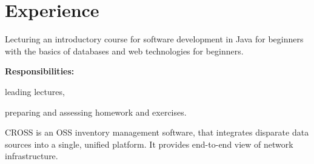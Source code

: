 \documentclass[a4paper]{deedy-resume}
\begin{document}
\section{Experience}
\vspace{\topsep}
Lecturing an introductory course for software development in Java for beginners with the basics of databases and web technologies for beginners.

\vspace{4pt}
\textbf{Responsibilities:}
\begin{tightitemize}
    \item leading lectures,
    \item preparing and assessing homework and exercises.
\end{tightitemize}
\sectionspace
CROSS is an OSS inventory management software, that integrates disparate data sources into a single, unified platform. It provides end-to-end view of network infrastructure.
\end{document}
